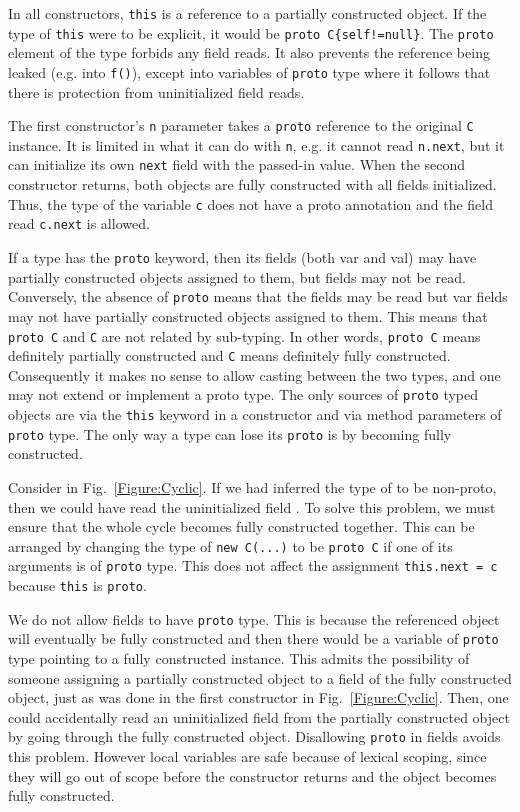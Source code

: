 In all constructors, \texttt{this} is a reference to a partially
    constructed object.
If the type of \texttt{this} were to be explicit, it would
be \texttt{proto C\{self!=null\}}.  The \texttt{proto} element of the type
forbids any field reads.  It also prevents the reference being leaked (e.g.
into \texttt{f()}), except into variables of \texttt{proto} type where it
follows that there is protection from uninitialized field reads.

The first constructor's \texttt{n} parameter takes a \texttt{proto} reference
to the original \texttt{C} instance.  It is limited in what it can do with
\texttt{n}, e.g. it cannot read \texttt{n.next}, but it can initialize its own
\texttt{next} field with the passed-in value.
When the second constructor returns, both objects are fully constructed with
all fields initialized.  Thus, the type of the variable \texttt{c} does not
have a proto annotation and the field read \texttt{c.next} is allowed.

If a type has the \texttt{proto} keyword, then its fields (both var and val)
may have partially constructed objects assigned to them, but fields may not be
read.  Conversely, the absence of \texttt{proto} means that the fields may be
read but var fields may not have partially constructed objects assigned to them.
This means that \texttt{proto C} and \texttt{C} are not related by sub-typing.
In other words, \texttt{proto C} means definitely partially constructed and
\texttt{C} means definitely fully constructed.  Consequently it makes no sense
to allow casting between the two types, and one may not extend or implement a
proto type.  The only sources of \texttt{proto} typed objects are via the
\texttt{this} keyword in a constructor and via method parameters of
\texttt{proto} type.  The only way a type can lose its \texttt{proto} is by
becoming fully constructed.

Consider  in Fig.~\ref{Figure:Cyclic}.
If we had inferred the type of  to be non-proto,
    then we could have read the uninitialized field .
To solve this problem, we must ensure that the whole cycle becomes fully
constructed together.
This can be arranged by changing the type of \texttt{new
C(...)} to be \texttt{proto C} if one of its arguments is of \texttt{proto}
type.  This does not affect the assignment \texttt{this.next = c} because
\texttt{this} is \texttt{proto}.

We do not allow fields to have \texttt{proto} type.  This is because the
referenced object will eventually be fully constructed and then there would be
a variable of \texttt{proto} type pointing to a fully constructed instance.
This admits the possibility of someone assigning a partially constructed object
to a field of the fully constructed object, just as was done in the first
constructor in Fig.~\ref{Figure:Cyclic}.  Then, one could accidentally read an
uninitialized field from the partially constructed object by going through the
fully constructed object.  Disallowing \texttt{proto} in fields avoids this
problem.  However local variables are safe because of lexical scoping, since they
will go out of scope before the constructor returns and the object becomes
fully constructed.

